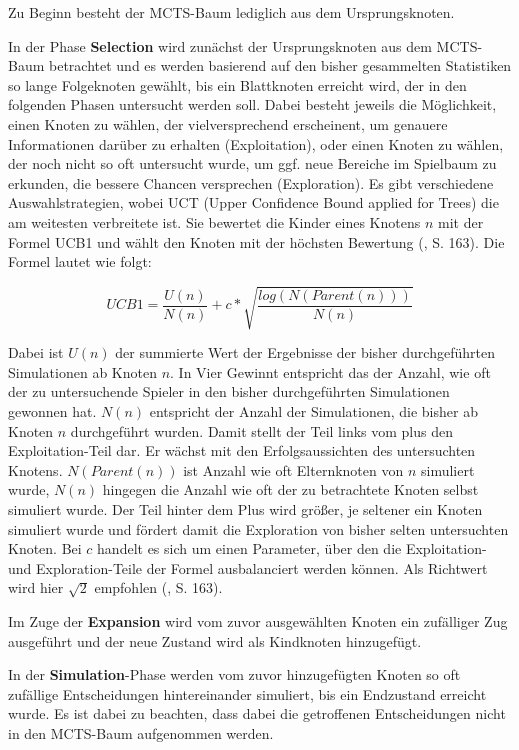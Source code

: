 Zu Beginn besteht der MCTS-Baum lediglich aus dem Ursprungsknoten.

In der Phase \textbf{Selection} wird zunächst der Ursprungsknoten aus dem MCTS-Baum betrachtet und es werden basierend auf den bisher gesammelten Statistiken so lange Folgeknoten gewählt, bis ein Blattknoten erreicht wird, der in den folgenden Phasen untersucht werden soll. Dabei besteht jeweils die Möglichkeit, einen Knoten zu wählen, der vielversprechend erscheinent, um genauere Informationen darüber zu erhalten (Exploitation), oder einen Knoten zu wählen, der noch nicht so oft untersucht wurde, um ggf. neue Bereiche im Spielbaum zu erkunden, die bessere Chancen versprechen (Exploration). Es gibt verschiedene Auswahlstrategien, wobei UCT (Upper Confidence Bound applied for Trees) die am weitesten verbreitete ist. Sie bewertet die Kinder eines Knotens $n$ mit der Formel UCB1 und wählt den Knoten mit der höchsten Bewertung (\cite{Russell.2020}, S. 163). Die Formel lautet wie folgt:

\begin{equation*}
	UCB1 = \frac{U(n)}{N(n)} + c * \sqrt{\frac{log(N(Parent(n)))}{N(n)}}
\end{equation*}

Dabei ist $U(n)$ der summierte Wert der Ergebnisse der bisher durchgeführten Simulationen ab Knoten $n$. In Vier Gewinnt entspricht das der Anzahl, wie oft der zu untersuchende Spieler in den bisher durchgeführten Simulationen gewonnen hat. $N(n)$ entspricht der Anzahl der Simulationen, die bisher ab Knoten $n$ durchgeführt wurden. Damit stellt der Teil links vom plus den Exploitation-Teil dar. Er wächst mit den Erfolgsaussichten des untersuchten Knotens.
$N(Parent(n))$ ist Anzahl wie oft Elternknoten von $n$ simuliert wurde, $N(n)$ hingegen die Anzahl wie oft der zu betrachtete Knoten selbst simuliert wurde. Der Teil hinter dem Plus wird größer, je seltener ein Knoten simuliert wurde und fördert damit die Exploration von bisher selten untersuchten Knoten.
Bei $c$ handelt es sich um einen Parameter, über den die Exploitation- und Exploration-Teile der Formel ausbalanciert werden können. Als Richtwert wird hier $\sqrt{2}$ empfohlen (\cite{Russell.2020}, S. 163).

Im Zuge der \textbf{Expansion} wird vom zuvor ausgewählten Knoten ein zufälliger Zug ausgeführt und der neue Zustand wird als Kindknoten hinzugefügt.

In der \textbf{Simulation}-Phase werden vom zuvor hinzugefügten Knoten so oft zufällige Entscheidungen hintereinander simuliert, bis ein Endzustand erreicht wurde. Es ist dabei zu beachten, dass dabei die getroffenen Entscheidungen nicht in den MCTS-Baum aufgenommen werden.

